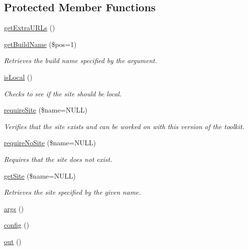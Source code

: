\subsection*{Protected Member Functions}
\begin{DoxyCompactItemize}
\item 
\hyperlink{classSiteBuildCommand_a247fa27974563e8161e6403942ce5d0d}{get\-Extra\-U\-R\-Ls} ()
\item 
\hyperlink{classGenericSiteCommand_a5562058d3e947b9d9306f473c64e6108}{get\-Build\-Name} (\$pos=1)
\begin{DoxyCompactList}\small\item\em Retrieves the build name specified by the argument. \end{DoxyCompactList}\item 
\hyperlink{classGenericSiteCommand_a5c0051d0cef1a895622617a706a34f9a}{is\-Local} ()
\begin{DoxyCompactList}\small\item\em Checks to see if the site should be local. \end{DoxyCompactList}\item 
\hyperlink{classGenericSiteCommand_afde72fc4f48280c3c60705977cdfdb78}{require\-Site} (\$name=N\-U\-L\-L)
\begin{DoxyCompactList}\small\item\em Verifies that the site exists and can be worked on with this version of the toolkit. \end{DoxyCompactList}\item 
\hyperlink{classGenericSiteCommand_a4fb8cea3d6d8e3fb81ab0f1d2852e606}{require\-No\-Site} (\$name=N\-U\-L\-L)
\begin{DoxyCompactList}\small\item\em Requires that the site does not exist. \end{DoxyCompactList}\item 
\hyperlink{classGenericSiteCommand_aab58878eb7b665d8c02b29d14856c5c6}{get\-Site} (\$name=N\-U\-L\-L)
\begin{DoxyCompactList}\small\item\em Retrieves the site specified by the given name. \end{DoxyCompactList}\item 
\hyperlink{classGenericCommand_a2b5ffbef597bcac2bb27fb9fe9ceb996}{args} ()
\item 
\hyperlink{classGenericCommand_a806e73ae27fe8187419963c1839531b4}{config} ()
\item 
\hyperlink{classGenericCommand_a08478bb9a4cce51c5eec24b4dab17cc8}{out} ()

\end{DoxyCompactItemize}
